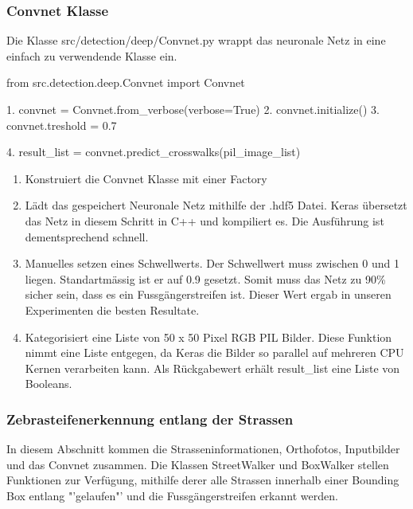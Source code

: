 \subsubsection{Convnet Klasse}
Die Klasse src/detection/deep/Convnet.py wrappt das neuronale Netz in eine einfach zu verwendende Klasse ein.
\begin{python}
	   from src.detection.deep.Convnet import Convnet
	   
	1. convnet = Convnet.from_verbose(verbose=True)
	2. convnet.initialize()
	3. convnet.treshold = 0.7
	
	4. result_list = convnet.predict_crosswalks(pil_image_list)
\end{python}
\begin{enumerate}
	\item Konstruiert die Convnet Klasse mit einer Factory
	\item Lädt das gespeichert Neuronale Netz mithilfe der .hdf5 Datei. Keras übersetzt das Netz in diesem Schritt in C++ und kompiliert es. Die Ausführung ist dementsprechend schnell.
	\item Manuelles setzen eines Schwellwerts. Der Schwellwert muss zwischen 0 und 1 liegen. Standartmässig ist er auf 0.9 gesetzt. Somit muss das Netz zu 90\% sicher sein, dass es ein Fussgängerstreifen ist. Dieser Wert ergab in unseren Experimenten die besten Resultate.
	\item Kategorisiert eine Liste von 50 x 50 Pixel RGB PIL Bilder. Diese Funktion nimmt eine Liste entgegen, da Keras die Bilder so parallel auf mehreren CPU Kernen verarbeiten kann. Als Rückgabewert erhält result\_list eine Liste von Booleans.
\end{enumerate}

\subsubsection{Zebrasteifenerkennung entlang der Strassen}
In diesem Abschnitt kommen die Strasseninformationen, Orthofotos, Inputbilder und das Convnet zusammen. Die Klassen StreetWalker und BoxWalker stellen Funktionen zur Verfügung, mithilfe derer alle Strassen innerhalb einer Bounding Box entlang "'gelaufen"' und die Fussgängerstreifen erkannt werden.

